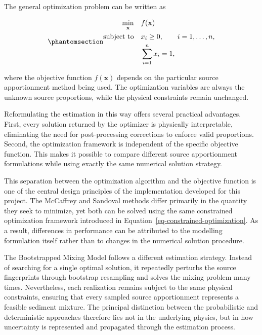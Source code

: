 \documentclass[
  12pt,
  letterpaper,
]{book}
\begin{document}
The general optimization problem can be written as

\begin{equation}\phantomsection\label{eq-constrained-optimization}{
\begin{aligned}
\min_{\mathbf{x}}\quad & f(\mathbf{x}) \\
\text{subject to}\quad
& x_i \ge 0,\qquad i=1,\ldots,n,\\
& \sum_{i=1}^{n}x_i = 1,
\end{aligned}
}\end{equation}

where the objective function \(f(\mathbf{x})\) depends on the particular
source apportionment method being used. The optimization variables are
always the unknown source proportions, while the physical constraints
remain unchanged.

Reformulating the estimation in this way offers several practical
advantages. First, every solution returned by the optimizer is
physically interpretable, eliminating the need for post-processing
corrections to enforce valid proportions. Second, the optimization
framework is independent of the specific objective function. This makes
it possible to compare different source apportionment formulations while
using exactly the same numerical solution strategy.

This separation between the optimization algorithm and the objective
function is one of the central design principles of the implementation
developed for this project. The McCaffrey and Sandoval methods differ
primarily in the quantity they seek to minimize, yet both can be solved
using the same constrained optimization framework introduced in
Equation~\ref{eq-constrained-optimization}. As a result, differences in
performance can be attributed to the modelling formulation itself rather
than to changes in the numerical solution procedure.

The Bootstrapped Mixing Model follows a different estimation strategy.
Instead of searching for a single optimal solution, it repeatedly
perturbs the source fingerprints through bootstrap resampling and solves
the mixing problem many times. Nevertheless, each realization remains
subject to the same physical constraints, ensuring that every sampled
source apportionment represents a feasible sediment mixture. The
principal distinction between the probabilistic and deterministic
approaches therefore lies not in the underlying physics, but in how
uncertainty is represented and propagated through the estimation
process.
\end{document}
